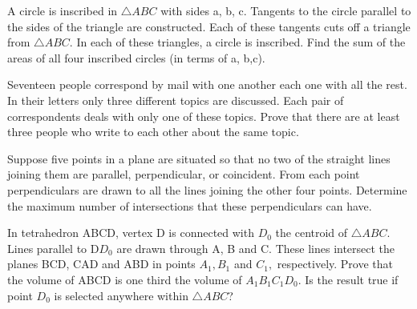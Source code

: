 \item A circle is inscribed in $\triangle{ABC}$ with sides a, b, c. Tangents to the circle parallel to the sides of the triangle are constructed. Each of these tangents cuts off a triangle from $\triangle{ABC}.$ In each of these triangles, a circle is inscribed. Find the sum of the areas of all four inscribed circles (in terms of a, b,c).
\item Seventeen people correspond by mail with one another each one with all the rest. In their letters only three different topics are discussed. Each pair of correspondents deals with only one of these topics. Prove that there are at least three people who write to each other about the same topic.
\item Suppose five points in a plane are situated so that no two of the straight lines joining them are parallel, perpendicular, or coincident. From each point perpendiculars are drawn to all the lines joining the other four points. Determine the maximum number of intersections that these perpendiculars can have.
\item In tetrahedron ABCD, vertex D is connected with $D_0$ the centroid of $\triangle{ABC}.$ Lines parallel to D$D_0$ are drawn through A, B and C. These lines intersect the planes BCD, CAD and ABD in points $A_1, B_1$ and $C_1,$ respectively. Prove that the volume of ABCD is one third the volume of $A_1B_1C_1D_0.$ Is the result true if point $D_0$ is selected anywhere within $\triangle{ABC}$?


